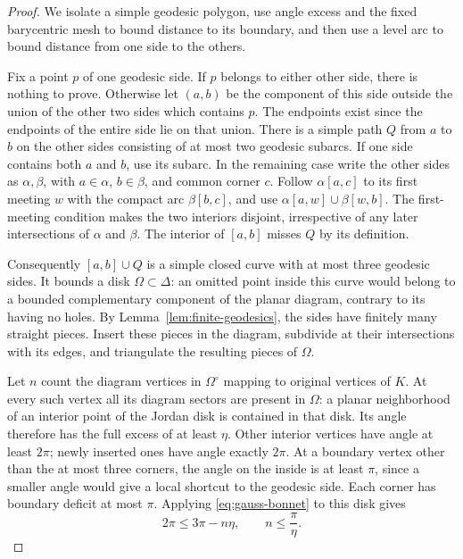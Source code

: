 \begin{proof}
We isolate a simple geodesic polygon, use angle excess and the fixed
barycentric mesh to bound distance to its boundary, and then use a level
arc to bound distance from one side to the others.

Fix a point $p$ of one geodesic side. If $p$ belongs to either other side,
there is nothing to prove. Otherwise let $(a,b)$ be the component of this
side outside the union of the other two sides which contains $p$.
The endpoints exist since the endpoints of the entire side lie on that
union. There is a simple path $Q$ from $a$ to $b$ on the other sides
consisting of at most two geodesic subarcs. If one side contains both
$a$ and $b$, use its subarc. In the remaining case write the other sides
as $\alpha,\beta$, with $a\in\alpha$, $b\in\beta$, and common corner $c$.
Follow $\alpha[a,c]$ to its first meeting $w$ with the compact arc
$\beta[b,c]$, and use
$\alpha[a,w]\cup\beta[w,b]$. The first-meeting condition makes the two
interiors disjoint, irrespective of any later intersections of
$\alpha$ and $\beta$. The interior of $[a,b]$ misses $Q$ by its definition.

Consequently $[a,b]\cup Q$ is a simple closed curve with at most three
geodesic sides. It bounds a disk $\Omega\subset\Delta$: an omitted point
inside this curve would belong to a bounded complementary component of
the planar diagram, contrary to its having no holes. By
Lemma~\ref{lem:finite-geodesics}, the sides have finitely many straight
pieces. Insert these pieces in the diagram, subdivide at their
intersections with its edges, and triangulate the resulting pieces of
$\Omega$.

Let $n$ count the diagram vertices in $\Omega^\circ$ mapping to original
vertices of $K$. At every such vertex all its diagram sectors are present
in $\Omega$: a planar neighborhood of an interior point of the Jordan
disk is contained in that disk. Its angle therefore has the full excess
of at least $\eta$. Other interior vertices have angle at least $2\pi$;
newly inserted ones have angle exactly $2\pi$. At a boundary vertex
other than the at most three corners, the angle on the inside is at least
$\pi$, since a smaller angle would give a local shortcut to the geodesic
side. Each corner has boundary deficit at most $\pi$. Applying
\eqref{eq:gauss-bonnet} to this disk gives
\[
 2\pi\le 3\pi-n\eta,\qquad n\le\frac{\pi}{\eta}.
\]


\end{proof}
